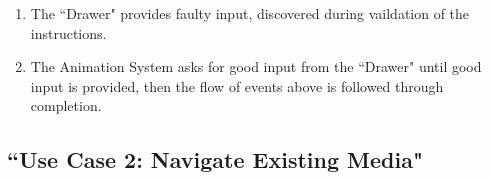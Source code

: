 \documentclass[12pt]{article}
\begin{document}
\begin{enumerate}
  \begin{enumerate}
    		\item The ``Drawer" provides faulty input, discovered during vaildation of the instructions.
		    \item The Animation System asks for good input from the ``Drawer" until good input is provided, then the flow of events above is followed through completion.
  \end{enumerate}
\end{enumerate}



  \subsection{``Use Case 2: Navigate Existing Media"}
\end{document}
